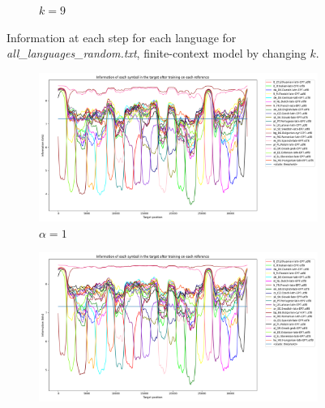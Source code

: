 \documentclass{article}
\begin{document}
\begin{figure}
\begin{subfigure}[b]{0.3\textwidth}
\begin{center}
        \end{center}
        \caption{$k = 9$}
        \label{fig:all_languages_random_p_c:1:9}
    \end{subfigure}
    
    \caption{Information at each step for each language for \textit{all\_languages\_random.txt}, finite-context model by changing $k$.}
    \label{fig:all_languages_random_p_c}
\end{figure}


\begin{figure}
    \begin{subfigure}[b]{0.3\textwidth}
        \begin{center}
            \includegraphics[width=1.0\linewidth]{../results/all_languages/-p_c:1:3.png}
        \end{center}
        \caption{$\alpha = 1$}
        \label{fig:all_languages_p_c:1:3_again}
    \end{subfigure}
    \hfill
    \begin{subfigure}[b]{0.3\textwidth}
        \begin{center}
            \includegraphics[width=1.0\linewidth]{../results/all_languages/-p_c:10:3.png}

\end{center}
\end{subfigure}
\end{figure}
\end{document}
